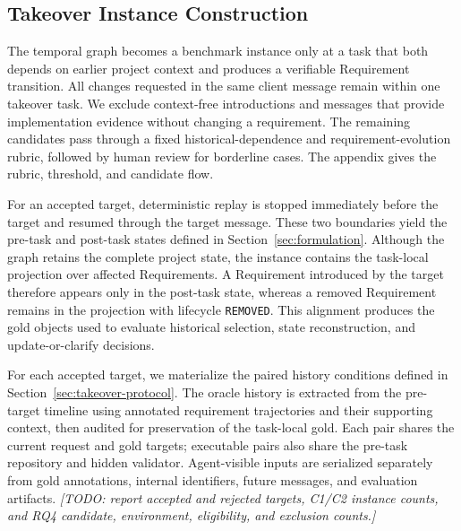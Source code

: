 \documentclass{article} %
\newcommand{\placeholder}[1]{\emph{[#1]}}
\begin{document}
\subsection{Takeover Instance Construction}

The temporal graph becomes a benchmark instance only at a task that both depends on earlier project context and produces a verifiable Requirement transition. All changes requested in the same client message remain within one takeover task. We exclude context-free introductions and messages that provide implementation evidence without changing a requirement. The remaining candidates pass through a fixed historical-dependence and requirement-evolution rubric, followed by human review for borderline cases. The appendix gives the rubric, threshold, and candidate flow.

For an accepted target, deterministic replay is stopped immediately before the target and resumed through the target message. These two boundaries yield the pre-task and post-task states defined in Section~\ref{sec:formulation}. Although the graph retains the complete project state, the instance contains the task-local projection over affected Requirements. A Requirement introduced by the target therefore appears only in the post-task state, whereas a removed Requirement remains in the projection with lifecycle \texttt{REMOVED}. This alignment produces the gold objects used to evaluate historical selection, state reconstruction, and update-or-clarify decisions.

For each accepted target, we materialize the paired history conditions defined in Section~\ref{sec:takeover-protocol}. The oracle history is extracted from the pre-target timeline using annotated requirement trajectories and their supporting context, then audited for preservation of the task-local gold. Each pair shares the current request and gold targets; executable pairs also share the pre-task repository and hidden validator. Agent-visible inputs are serialized separately from gold annotations, internal identifiers, future messages, and evaluation artifacts.
\placeholder{TODO: report accepted and rejected targets, C1/C2 instance counts, and RQ4 candidate, environment, eligibility, and exclusion counts.}
\end{document}
